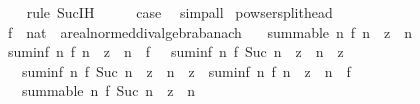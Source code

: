 \begin{isabellebody}
\ \ \ \ \isamarkupfalse%
\ {\isacharparenleft}{\kern0pt}rule\ Suc{\isachardot}{\kern0pt}IH{\isacharparenright}{\kern0pt}\isanewline
\ \ \isamarkupfalse%
\ \isamarkupfalse%
\ {\isacharquery}{\kern0pt}case\ \isacommand{{\isachardot}{\kern0pt}}\isamarkupfalse%
\isanewline
{}\isamarkupfalse%
\ simp{\isacharunderscore}{\kern0pt}all%
\endisatagproof
{\isafoldproof}%
%
\isadelimproof
\isanewline
%
\endisadelimproof
\isanewline
{}\isamarkupfalse%
\ powser{\isacharunderscore}{\kern0pt}split{\isacharunderscore}{\kern0pt}head{\isacharcolon}{\kern0pt}\isanewline
\ \ \ f\ {\isacharcolon}{\kern0pt}{\isacharcolon}{\kern0pt}\ {\isachardoublequoteopen}nat\ {\isasymRightarrow}\ {\isacharprime}{\kern0pt}a{\isacharcolon}{\kern0pt}{\isacharcolon}{\kern0pt}{\isacharbraceleft}{\kern0pt}real{\isacharunderscore}{\kern0pt}normed{\isacharunderscore}{\kern0pt}div{\isacharunderscore}{\kern0pt}algebra{\isacharcomma}{\kern0pt}banach{\isacharbraceright}{\kern0pt}{\isachardoublequoteclose}\isanewline
\ \ \ {\isachardoublequoteopen}summable\ {\isacharparenleft}{\kern0pt}{\isasymlambda}n{\isachardot}{\kern0pt}\ f\ n\ {\isacharasterisk}{\kern0pt}\ z\ {\isacharcircum}{\kern0pt}\ n{\isacharparenright}{\kern0pt}{\isachardoublequoteclose}\isanewline
\ \ \ {\isachardoublequoteopen}suminf\ {\isacharparenleft}{\kern0pt}{\isasymlambda}n{\isachardot}{\kern0pt}\ f\ n\ {\isacharasterisk}{\kern0pt}\ z\ {\isacharcircum}{\kern0pt}\ n{\isacharparenright}{\kern0pt}\ {\isacharequal}{\kern0pt}\ f\ {}\ {\isacharplus}{\kern0pt}\ suminf\ {\isacharparenleft}{\kern0pt}{\isasymlambda}n{\isachardot}{\kern0pt}\ f\ {\isacharparenleft}{\kern0pt}Suc\ n{\isacharparenright}{\kern0pt}\ {\isacharasterisk}{\kern0pt}\ z\ {\isacharcircum}{\kern0pt}\ n{\isacharparenright}{\kern0pt}\ {\isacharasterisk}{\kern0pt}\ z{\isachardoublequoteclose}\isanewline
\ \ \ \ \ {\isachardoublequoteopen}suminf\ {\isacharparenleft}{\kern0pt}{\isasymlambda}n{\isachardot}{\kern0pt}\ f\ {\isacharparenleft}{\kern0pt}Suc\ n{\isacharparenright}{\kern0pt}\ {\isacharasterisk}{\kern0pt}\ z\ {\isacharcircum}{\kern0pt}\ n{\isacharparenright}{\kern0pt}\ {\isacharasterisk}{\kern0pt}\ z\ {\isacharequal}{\kern0pt}\ suminf\ {\isacharparenleft}{\kern0pt}{\isasymlambda}n{\isachardot}{\kern0pt}\ f\ n\ {\isacharasterisk}{\kern0pt}\ z\ {\isacharcircum}{\kern0pt}\ n{\isacharparenright}{\kern0pt}\ {\isacharminus}{\kern0pt}\ f\ {}{\isachardoublequoteclose}\isanewline
\ \ \ \ \ {\isachardoublequoteopen}summable\ {\isacharparenleft}{\kern0pt}{\isasymlambda}n{\isachardot}{\kern0pt}\ f\ {\isacharparenleft}{\kern0pt}Suc\ n{\isacharparenright}{\kern0pt}\ {\isacharasterisk}{\kern0pt}\ z\ {\isacharcircum}{\kern0pt}\ n{\isacharparenright}{\kern0pt}{\isachardoublequoteclose}\isanewline

\end{isabellebody}
